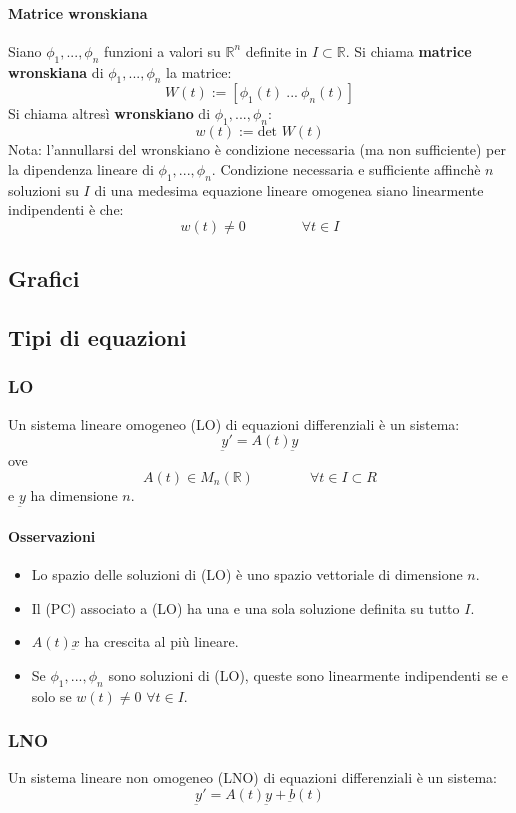 \documentclass[a4paper,12pt]{article}
\begin{document}
\paragraph{Matrice wronskiana}
Siano $\phi_1,...,\phi_n$ funzioni a valori su $\mathbb{R}^n$ definite in $I\subset \mathbb{R}$.
Si chiama \textbf{matrice wronskiana} di $\phi_1,...,\phi_n$ la matrice:
$$W(t):=[\phi_1(t)\ ...\ \phi_n(t)]$$
Si chiama altresì \textbf{wronskiano} di $\phi_1,...,\phi_n$:
$$w(t):=\text{det } W(t)$$
Nota: l'annullarsi del wronskiano è condizione necessaria (ma non sufficiente) per la dipendenza lineare di $\phi_1,...,\phi_n$. 
Condizione necessaria e sufficiente affinchè $n$ soluzioni su $I$ di una medesima equazione lineare omogenea siano linearmente indipendenti è che:
$$ w(t)\neq0 \qquad\qquad \forall t \in I$$

\subsection{Grafici}


\subsection{Tipi di equazioni}
\subsubsection{LO}
Un sistema lineare omogeneo (LO) di equazioni differenziali è un sistema:
$$\underbar{y}' = A(t)\underbar{y}$$
ove $$A(t)\in M_n(\mathbb{R})\qquad \qquad \forall t\in I\subset R$$ e $\underbar{y}$ ha dimensione $n$.
\paragraph{Osservazioni}
\begin{itemize}
 \item Lo spazio delle soluzioni di (LO) è uno spazio vettoriale di dimensione $n$.
 \item Il (PC) associato a (LO) ha una e una sola soluzione definita su tutto $I$.
 \item $A(t)\underbar{x}$ ha crescita al più lineare.
 \item Se $\phi_1,...,\phi_n$ sono soluzioni di (LO), queste sono linearmente indipendenti se e solo se $w(t)\neq0$ $\forall t \in I$.
\end{itemize}

\subsubsection{LNO}
Un sistema lineare non omogeneo (LNO) di equazioni differenziali è un sistema:
$$\underbar{y}' = A(t)\underbar{y} + \underbar{b}(t)$$
\end{document}
